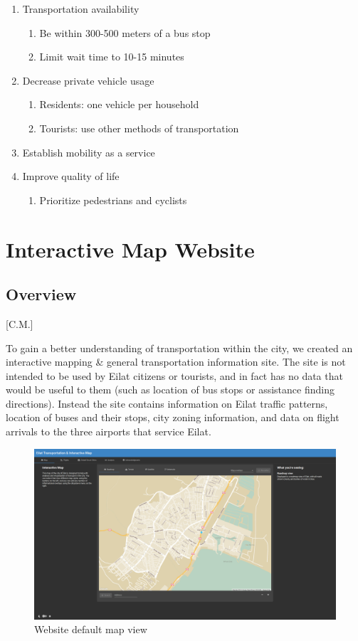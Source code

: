 \documentclass[12pt]{article}                       %
\begin{document}
\begin{enumerate}
    \item Transportation availability
    \begin{enumerate}
        \item Be within 300-500 meters of a bus stop
        \item Limit wait time to 10-15 minutes
    \end{enumerate}
    \item Decrease private vehicle usage
    \begin{enumerate}
        \item Residents: one vehicle per household
        \item Tourists: use other methods of transportation
    \end{enumerate}
    \item Establish mobility as a service
    \item Improve quality of life
    \begin{enumerate}
        \item Prioritize pedestrians and cyclists
    \end{enumerate}
\end{enumerate}

\newpage
\section{Interactive Map Website}
\subsection{Overview}[C.M.]

To gain a better understanding of transportation within the city, we created an interactive mapping \& general transportation information site. The site is not intended to be used by Eilat citizens or tourists, and in fact has no data that would be useful to them (such as location of bus stops or assistance finding directions). Instead the site contains information on Eilat traffic patterns, location of buses and their stops, city zoning information, and data on flight arrivals to the three airports that service Eilat. 

\begin{figure}[H]
    \centering
    \includegraphics[width=12cm]{images/site_map.png}
    \caption{Website default map view}
    \label{img:site_map}
\end{figure}
\end{document}

